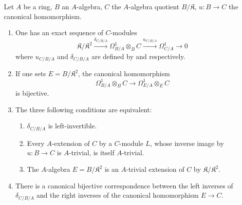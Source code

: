\begin{theorem}[20.5.12]
\label{0.20.5.12}
Let $A$ be a ring, $B$ an $A$-algebra, $C$ the $A$-algebra quotient $B/\mathfrak{K}$, $u:B\to C$ the canonical homomorphism.
\begin{enumerate}
  \item[\rm(i)] One has an exact sequence of $C$-modules
\begin{equation}
\tag{20.5.12.1}
  \label{0.20.5.12.1}
  \mathfrak{K}/\mathfrak{K}^2\xrightarrow{\delta_{C/B/A}}\Omega^1_{B/A}\otimes_B C\xrightarrow{u_{C/B/A}}\Omega^1_{C/A}\to 0
\end{equation}
where $u_{C/B/A}$ and $\delta_{C/B/A}$ are defined by  and  respectively.
  \item[\rm(ii)] If one sets $E=B/\mathfrak{K}^2$, the canonical homomorphism 
\[
  \Omega^1_{B/A}\otimes_B C\to\Omega^1_{E/A}\otimes_E C
\]
is bijective.
  \item[\rm(iii)] The three following conditions are equivalent:
  \begin{enumerate}
    \item[\rm a)] $\delta_{C/B/A}$ is left-invertible.
    \item[\rm b)] Every $A$-extension of $C$ by a $C$-module $L$, whose inverse image by $u:B\to C$ is $A$-trivial, is itself $A$-trivial.
    \item[\rm c)] The $A$-algebra $E=B/\mathfrak{K}^2$ is an $A$-trivial extension of $C$ by $\mathfrak{K}/\mathfrak{K}^2$.
  \end{enumerate}
  \item[\rm(iv)] There is a canonical bijective correspondence between the left inverses of $\delta_{C/B/A}$ and the right inverses of the canonical homomorphism $E\to C$.
\end{enumerate}
\end{theorem}

